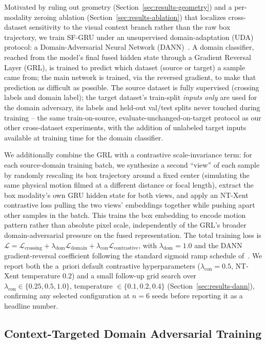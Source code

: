 Motivated by ruling out geometry (Section~\ref{sec:results-geometry})
and a per-modality zeroing ablation
(Section~\ref{sec:results-ablation}) that localizes cross-dataset
sensitivity to the visual context branch rather than the raw box
trajectory, we train SF-GRU under an unsupervised domain-adaptation
(UDA) protocol: a Domain-Adversarial Neural Network
(DANN)~\cite{ganin2015dann}. A domain classifier, reached from the
model's final fused hidden state through a Gradient Reversal Layer
(GRL), is trained to predict which dataset (source or target) a sample
came from; the main network is trained, via the reversed gradient, to
make that prediction as difficult as possible. The source dataset is
fully supervised (crossing labels and domain label); the target
dataset's train-split \emph{inputs only} are used for the domain
adversary, its labels and held-out val/test splits never touched during
training -- the same train-on-source, evaluate-unchanged-on-target
protocol as our other cross-dataset experiments, with the addition of
unlabeled target inputs available at training time for the domain
classifier.

We additionally combine the GRL with a contrastive scale-invariance
term: for each source-domain training batch, we synthesize a second
``view'' of each sample by randomly rescaling its box trajectory around
a fixed center (simulating the same physical motion filmed at a
different distance or focal length), extract the box modality's own GRU
hidden state for both views, and apply an NT-Xent contrastive loss
pulling the two views' embeddings together while pushing apart other
samples in the batch. This trains the box embedding to encode motion
pattern rather than absolute pixel scale, independently of the GRL's
broader domain-adversarial pressure on the fused representation. The
total training loss is $\mathcal{L} = \mathcal{L}_{\text{crossing}} +
\lambda_{\text{dom}} \mathcal{L}_{\text{domain}} +
\lambda_{\text{con}} \mathcal{L}_{\text{contrastive}}$, with
$\lambda_{\text{dom}}=1.0$ and the DANN gradient-reversal coefficient
following the standard sigmoid ramp schedule of~\cite{ganin2015dann}. We
report both the a~priori default contrastive hyperparameters
($\lambda_{\text{con}}=0.5$, NT-Xent temperature $0.2$) and a small
follow-up grid search over $\lambda_{\text{con}} \in
\{0.25,0.5,1.0\}$, temperature $\in \{0.1,0.2,0.4\}$
(Section~\ref{sec:results-dann}), confirming any selected configuration
at $n=6$ seeds before reporting it as a headline number.

\subsection{Context-Targeted Domain Adversarial Training}
\label{sec:method-context}

